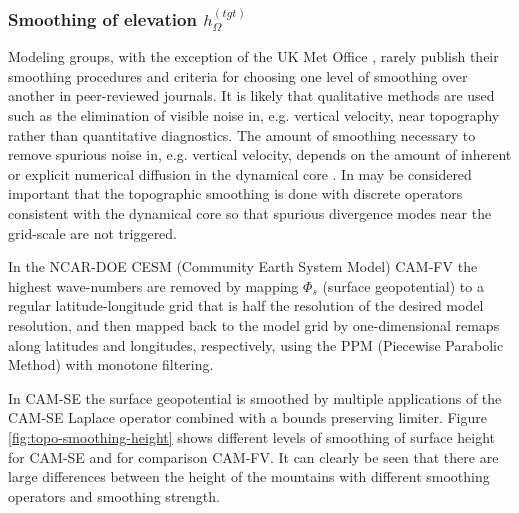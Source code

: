 \documentclass[gmd]{copernicus}
\begin{document}
\subsubsection{Smoothing of elevation  $h^{(tgt)}_{\Omega}$}\label{sec:smoothing}
Modeling groups, with the exception of the UK Met Office \citep{WBCJ2003QJRMS}, rarely publish their smoothing procedures and criteria for choosing one level of smoothing over another in peer-reviewed journals. It is likely that qualitative methods are used such as the elimination of visible noise in, e.g. vertical velocity, near topography rather than quantitative diagnostics. The amount of smoothing necessary to remove spurious noise in, e.g. vertical velocity, depends on the amount of inherent or explicit numerical diffusion in the dynamical core \citep[e.g., ][]{L2011IJHPC}. In may be considered important that the topographic smoothing is done with discrete operators consistent with the dynamical core so that spurious divergence modes near the grid-scale are not triggered.

In the NCAR-DOE CESM (Community Earth System Model) CAM-FV \citep[Community Atmosphere Model - Finite-Volume; ][]{L2004MWR} the highest wave-numbers are removed by mapping $\Phi_s$ (surface geopotential) to a regular latitude-longitude grid that is half the resolution of the desired model resolution, and then mapped back to the model grid by one-dimensional remaps along latitudes and longitudes, respectively, using the PPM (Piecewise Parabolic Method) with monotone filtering. 

In CAM-SE \citep[Community Atmosphere Model - Spectral-Elements;][]{DetAl2012IJHPCA,CAM5} the surface geopotential is smoothed by multiple applications of the CAM-SE Laplace operator combined with a bounds preserving limiter. Figure \ref{fig:topo-smoothing-height} shows different levels of smoothing of surface height for CAM-SE and for comparison CAM-FV. It can clearly be seen that there are large differences between the height of the mountains with different smoothing operators and smoothing strength. 
\end{document}
